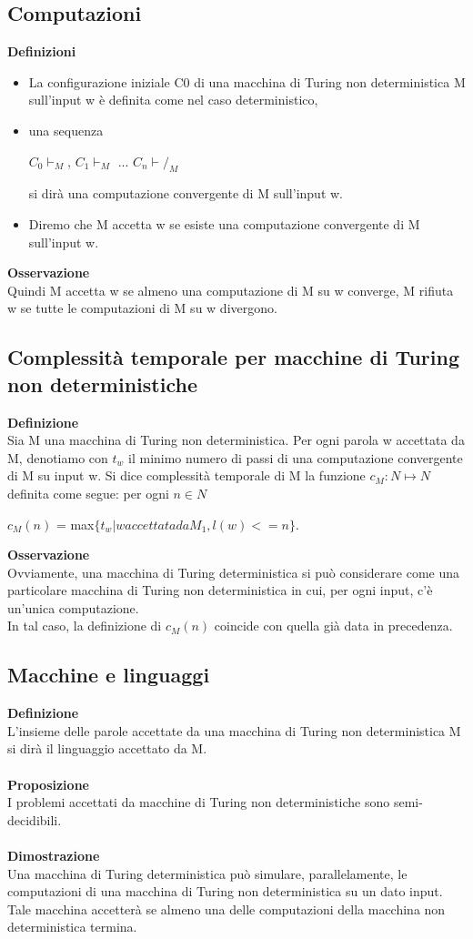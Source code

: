 \subsection{Computazioni}
\textbf{Definizioni}\\
\begin{itemize}
    \item La configurazione iniziale C0 di una macchina di Turing non deterministica M sull’input w è definita come nel caso deterministico,
    
    \item una sequenza
    
    $C_0\vdash_M$, $C_1\vdash_M$ ... $C_n\vdash/_M$
    
    si dirà una computazione convergente di M sull’input w.
    
    \item Diremo che M accetta w se esiste una computazione convergente di M sull’input w.
\end{itemize}
\textbf{Osservazione}\\
Quindi M accetta w se almeno una computazione di M su w converge, M rifiuta w se tutte le computazioni di M su w divergono.
\subsection{Complessità temporale per macchine di Turing non deterministiche}
\textbf{Definizione}\\
Sia M una macchina di Turing non deterministica.
Per ogni parola w accettata da M, denotiamo con $t_w$ il minimo numero di passi di una computazione convergente di M su input w.
Si dice complessità temporale di M la funzione $c_M : N \mapsto N$ definita come segue: per ogni $n \in N$
\begin{center}
    $c_M (n)$ = max$\{t_w | w accettata da M_1, l(w) <= n\}$.
\end{center}
\textbf{Osservazione}\\
Ovviamente, una macchina di Turing deterministica si può considerare come una particolare macchina di Turing non deterministica in cui, per ogni input, c’è un’unica computazione. \\
In tal caso, la definizione di $c_M (n)$ coincide con quella già data in precedenza.
\subsection{Macchine e linguaggi}
\textbf{Definizione}\\
L’insieme delle parole accettate da una macchina di Turing non deterministica M si dirà il linguaggio accettato da M.\\\\
\textbf{Proposizione}\\
I problemi accettati da macchine di Turing non deterministiche sono semi-decidibili.\\\\
\textbf{Dimostrazione}\\
Una macchina di Turing deterministica può simulare, parallelamente, le computazioni di una macchina di Turing non deterministica su un dato
input.\\
Tale macchina accetterà se almeno una delle computazioni della macchina
non deterministica termina.
